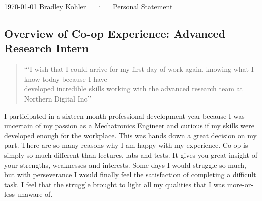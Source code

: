 \documentclass[14pt, a4paper]{awesome-cv}
\begin{document}
\makecvheader[R]

\makecvfooter
  {\today}
  {Bradley Kohler~~~·~~~Personal Statement}
  {}

\makelettertitle

\begin{cvletter}

\section*{Overview of Co-op Experience: Advanced Research Intern}
\begin{center}
\begin{quote}
```I wish that I could arrive for my first day of work again, knowing what I know today because I have\\
developed incredible skills working with the advanced research team at Northern Digital Inc''
\end{quote}
\end{center}
I participated in a sixteen-month professional development year because I was uncertain of my passion as a Mechatronics Engineer and curious if my skills were developed enough for the workplace.  This was hands down a great decision on my part.  There are so many reasons why I am happy with my experience.  Co-op is simply so much different than lectures, labs and tests.  It gives you great insight of your strengths, weaknesses and interests.  Some days I would struggle so much, but with perseverance I would finally feel the satisfaction of completing a difficult task.  I feel that the struggle brought to light all my qualities that I was more-or-less unaware of.


\end{cvletter}
\end{document}
